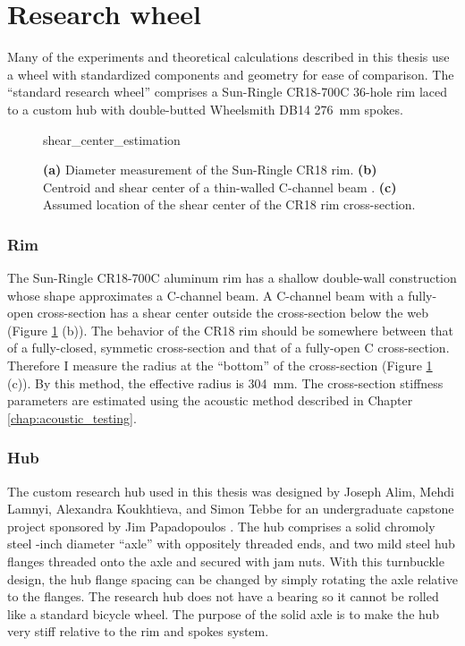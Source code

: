 \documentclass[../../thesis.tex]{subfiles}
\begin{document}
\section{Research wheel}
\label{app:std_research_wheel}
Many of the experiments and theoretical calculations described in this thesis use a wheel with standardized components and geometry for ease of comparison. The ``standard research wheel'' comprises a Sun-Ringle CR18-700C 36-hole rim laced to a custom hub with double-butted Wheelsmith DB14 \SI{276}{mm} spokes.

\begin{figure}[h]
\centering
{shear_center_estimation}
\caption{\textbf{(a)} Diameter measurement of the Sun-Ringle CR18 rim. \textbf{(b)} Centroid and shear center of a thin-walled C-channel beam \cite{Timoshenko1961}. \textbf{(c)} Assumed location of the shear center of the CR18 rim cross-section.}
\label{fig:shear_center_estimation}
\end{figure}

\subsubsection*{Rim}

The Sun-Ringle CR18-700C aluminum rim has a shallow double-wall construction whose shape approximates a C-channel beam. A C-channel beam with a fully-open cross-section has a shear center outside the cross-section below the web \cite{Timoshenko1961} (Figure \ref{fig:shear_center_estimation} (b)). The behavior of the CR18 rim should be somewhere between that of a fully-closed, symmetic cross-section and that of a fully-open C cross-section. Therefore I measure the radius at the ``bottom'' of the cross-section (Figure \ref{fig:shear_center_estimation} (c)). By this method, the effective radius is \SI{304}{mm}. The cross-section stiffness parameters are estimated using the acoustic method described in Chapter \ref{chap:acoustic_testing}.

\subsubsection*{Hub}
The custom research hub used in this thesis was designed by Joseph Alim, Mehdi Lamnyi, Alexandra Koukhtieva, and Simon Tebbe for an undergraduate capstone project sponsored by Jim Papadopoulos \cite{Alim2016}. The hub comprises a solid chromoly steel -inch diameter ``axle'' with oppositely threaded ends, and two mild steel hub flanges threaded onto the axle and secured with jam nuts. With this turnbuckle design, the hub flange spacing can be changed by simply rotating the axle relative to the flanges. The research hub does not have a bearing so it cannot be rolled like a standard bicycle wheel. The purpose of the solid axle is to make the hub very stiff relative to the rim and spokes system.
\end{document}
